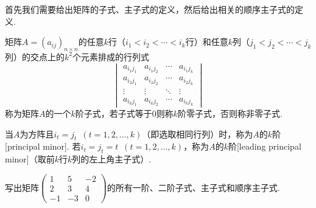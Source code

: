 首先我们需要给出矩阵的子式、主子式的定义，然后给出相关的顺序主子式的定义.
\begin{definition}
    矩阵$A=(a_{ij})_{n \times n}$的任意$k$行（$i_1<i_2<\cdots<i_k$行）和任意$k$列（$j_1<j_2<\cdots<j_k$列）的交点上的$k^2$个元素排成的行列式
    \[\begin{vmatrix}
            a_{i_1j_1} & a_{i_1j_2} & \cdots & a_{i_1j_k} \\
            a_{i_2j_1} & a_{i_2j_2} & \cdots & a_{i_2j_k} \\
            \vdots     & \vdots     & \ddots & \vdots     \\
            a_{i_kj_1} & a_{i_kj_2} & \cdots & a_{i_kj_k}
        \end{vmatrix}\]
    称为矩阵$A$的一个$k$阶子式，若子式等于0则称$k$阶零子式，否则称非零子式.

    当$A$为方阵且$i_t=j_t\enspace(t=1,2,\ldots,k)$（即选取相同行列）时，称为$A$的$k$阶[principal minor]. 若$i_t=j_t=t\enspace(t=1,2,\ldots,k)$，称为$A$的$k$阶[leading principal minor]（取前$k$行$k$列的左上角主子式）.
\end{definition}

\begin{example}
    写出矩阵$\begin{pmatrix}
            1 & 5 & -2 \\ 2 & 3 & 4 \\ -1 & -3 & 0
        \end{pmatrix}$的所有一阶、二阶子式、主子式和顺序主子式.
\end{example}

